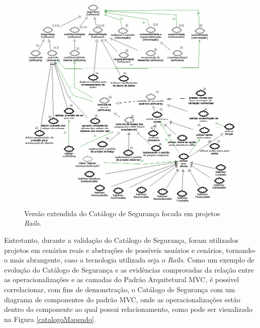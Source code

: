 \pagebreak

\begin{figure}[h!]
	\centering
	\includegraphics[keepaspectratio=true,scale=0.65]{figuras/catalogoFull.PNG}
	\caption{Versão extendida do Catálogo de Segurança focada em projetos \textit{Rails}.}
	\label{catalogoFull}
\end{figure}


Entretanto, durante a validação do Catálogo de Segurança, foram utilizados projetos em cenários reais e abstrações de possíveis usuários e cenários, tornando-o mais abrangente, caso a tecnologia utilizada seja o \textit{Rails}. Como um exemplo de evolução do Catálogo de Segurança e as evidências comprovadas da relação entre as operacionalizações e as camadas do Padrão Arquitetural MVC, é possível correlacionar, com fins de demonstração, o Catálogo de Segurança com um diagrama de componentes do padrão MVC, onde as operacionalizações estão dentro do componente ao qual possui relacionamento, como pode ser visualizado na Figura \ref{catalogoMapeado}. 



